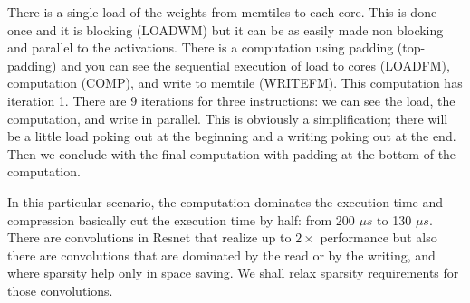 \documentclass[sigconf]{acmart}
\begin{document}
There is a single load of the weights from memtiles to each
core. This is done once and it is blocking (LOADWM) but it can be as
easily made non blocking and parallel to the activations. There is a
computation using padding (top-padding) and you can see the sequential
execution of load to cores (LOADFM), computation (COMP), and write to
memtile (WRITEFM). This computation has iteration 1. There are 9
iterations for three instructions: we can see the load, the
computation, and write in parallel. This is obviously a
simplification; there will be a little load poking out at the
beginning and a writing poking out at the end.  Then we conclude with
the final computation with padding at the bottom of the computation.

In this particular scenario, the computation dominates the execution
time and compression basically cut the execution time by half: from
200 $\mu s$ to 130 $\mu s$. There are convolutions in Resnet that
realize up to $2\times$ performance but also there are convolutions
that are dominated by the read or by the writing, and where sparsity
help only in space saving. We shall relax sparsity requirements for
those convolutions.

\end{document}
